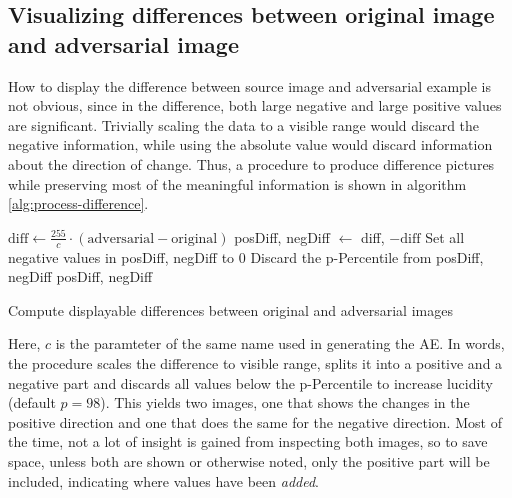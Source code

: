 \documentclass[11pt, a4paper]{article}
\newcommand\braces[1]{\left(#1\right)}
\begin{document}
\begin{appendix}
	\section{Visualizing differences between original image and adver\-sarial image}
	\label{sec:visualizing-diff}
	How to display the difference between source image and adversarial example is not obvious, since in the difference, both large negative and large positive values are significant. Trivially scaling the data to a visible range would discard the negative information, while using the absolute value would discard information about the direction of change. Thus, a procedure to produce difference pictures while preserving most of the meaningful information is shown in algorithm \ref{alg:process-difference}.
	
\begin{algorithm}
	\begin{algorithmic}
			\State $\text{diff} \gets \frac{255}{c} \cdot \braces{\text{adversarial} - \text{original}}$
			\State posDiff, negDiff $\gets$ diff, $- \text{diff}$
			\State
			\State Set all negative values in posDiff, negDiff to 0
			\State Discard the p-Percentile from posDiff, negDiff
			\State
			\State \Return posDiff, negDiff
		\EndFunction
	\end{algorithmic}
	\caption[Displaying differences between original and adversarial images]{Compute displayable differences between original and adversarial images}
	\label{alg:process-difference}
\end{algorithm}
	
	Here, $c$ is the paramteter of the same name used in generating the AE. In words, the procedure scales the difference to visible range, splits it into a positive and a negative part and discards all values below the p-Percentile to increase lucidity (default $p = 98$). This yields two images, one that shows the changes in the positive direction and one that does the same for the negative direction. Most of the time, not a lot of insight is gained from inspecting both images, so to save space, unless both are shown or otherwise noted, only the positive part will be included, indicating where values have been \emph{added}.
\end{appendix}

\listoffigures
\listoftables
\listofalgorithms

%

\end{document}
